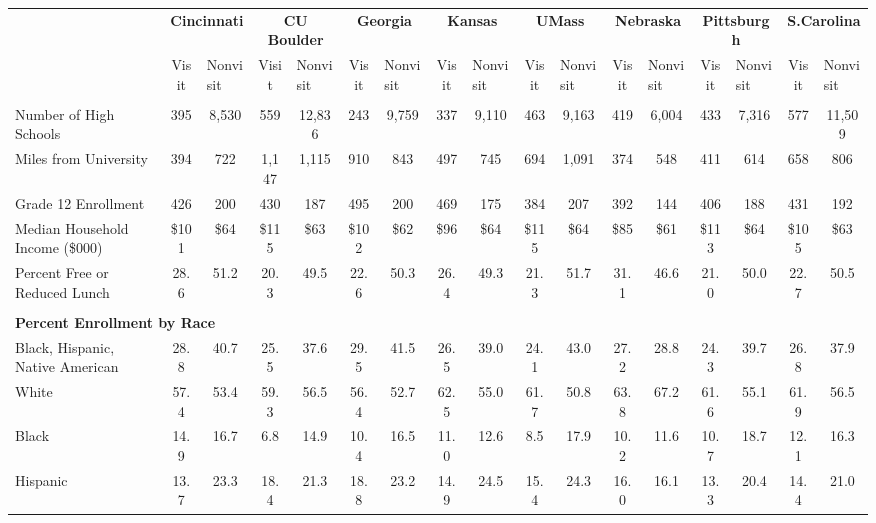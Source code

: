 \begin{tabular*}{\linewidth}{@{\extracolsep{\fill} } lcccccccccccccccc}%
&\multicolumn{2}{c}{\bfseries Cincinnati}&\multicolumn{2}{c}{\bfseries CU Boulder}&\multicolumn{2}{c}{\bfseries Georgia}&\multicolumn{2}{c}{\bfseries Kansas}&\multicolumn{2}{c}{\bfseries UMass}&\multicolumn{2}{c}{\bfseries Nebraska}&\multicolumn{2}{c}{\bfseries Pittsburgh}&\multicolumn{2}{c}{\bfseries S.Carolina}\\%
&Visit&\multicolumn{1}{l}{Nonvisit}&Visit&\multicolumn{1}{l}{Nonvisit}&Visit&\multicolumn{1}{l}{Nonvisit}&Visit&\multicolumn{1}{l}{Nonvisit}&Visit&\multicolumn{1}{l}{Nonvisit}&Visit&\multicolumn{1}{l}{Nonvisit}&Visit&\multicolumn{1}{l}{Nonvisit}&Visit&\multicolumn{1}{l}{Nonvisit}\\%
\hline%
&&&&&&&&&&&&&&&&\\%
\hspace{0cm}Number of High Schools&395&8,530&559&12,836&243&9,759&337&9,110&463&9,163&419&6,004&433&7,316&577&11,509\\%
\hspace{0cm}Miles from University&394&722&1,147&1,115&910&843&497&745&694&1,091&374&548&411&614&658&806\\%
\hspace{0cm}Grade 12 Enrollment&426&200&430&187&495&200&469&175&384&207&392&144&406&188&431&192\\%
\hspace{0cm}Median Household Income (\$000)&\$101&\$64&\$115&\$63&\$102&\$62&\$96&\$64&\$115&\$64&\$85&\$61&\$113&\$64&\$105&\$63\\%
\hspace{0cm}Percent Free or Reduced Lunch&28.6&51.2&20.3&49.5&22.6&50.3&26.4&49.3&21.3&51.7&31.1&46.6&21.0&50.0&22.7&50.5\\%
&&&&&&&&&&&&&&&&\\%
\multicolumn{17}{l}{\bfseries Percent Enrollment by Race}\\%
\hspace{0.2cm}Black, Hispanic, Native American&28.8&40.7&25.5&37.6&29.5&41.5&26.5&39.0&24.1&43.0&27.2&28.8&24.3&39.7&26.8&37.9\\%
\hspace{0.2cm}White&57.4&53.4&59.3&56.5&56.4&52.7&62.5&55.0&61.7&50.8&63.8&67.2&61.6&55.1&61.9&56.5\\%
\hspace{0.2cm}Black&14.9&16.7&6.8&14.9&10.4&16.5&11.0&12.6&8.5&17.9&10.2&11.6&10.7&18.7&12.1&16.3\\%
\hspace{0.2cm}Hispanic&13.7&23.3&18.4&21.3&18.8&23.2&14.9&24.5&15.4&24.3&16.0&16.1&13.3&20.4&14.4&21.0\\%

\end{tabular*}
